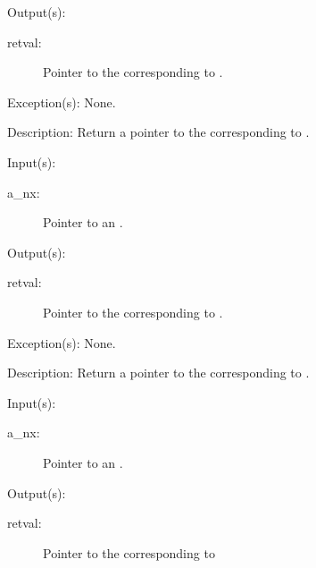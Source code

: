 \begin{capi}
\begin{capilist}
	\item[Output(s): ]
		\begin{description}\item[]
		\item[retval: ]
			Pointer to the  corresponding to
			.
		\end{description}
	\item[Exception(s): ] None.
	\item[Description: ]
		Return a pointer to the  corresponding to
		.
	\end{capilist}
\label{nx_stdin_get}
	\begin{capilist}
	\item[Input(s): ]
		\begin{description}\item[]
		\item[a\_nx: ]
			Pointer to an .
		\end{description}
	\item[Output(s): ]
		\begin{description}\item[]
		\item[retval: ]
			Pointer to the  corresponding to
			.
		\end{description}
	\item[Exception(s): ] None.
	\item[Description: ]
		Return a pointer to the  corresponding to
		.
	\end{capilist}
\label{nx_stdout_get}
	\begin{capilist}
	\item[Input(s): ]
		\begin{description}\item[]
		\item[a\_nx: ]
			Pointer to an \classname{nx}.
		\end{description}
	\item[Output(s): ]
		\begin{description}\item[]
		\item[retval: ]
			Pointer to the  corresponding to

\end{description}
\end{capilist}
\end{capi}
